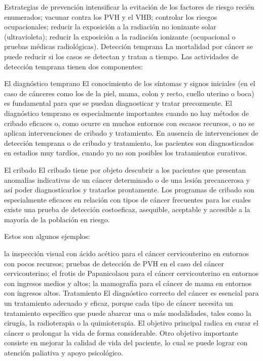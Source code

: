 \documentclass[../pfc.tex]{subfiles}
\begin{document}
Estrategias de prevención
intensificar la evitación de los factores de riesgo recién enumerados;
vacunar contra los PVH y el VHB;
controlar los riesgos ocupacionales;
reducir la exposición a la radiación no ionizante solar (ultravioleta);
reducir la exposición a la radiación ionizante (ocupacional o pruebas médicas radiológicas).
Detección temprana
La mortalidad por cáncer se puede reducir si los casos se detectan y tratan a tiempo. Las actividades de detección temprana tienen dos componentes:

El diagnóstico temprano
El conocimiento de los síntomas y signos iniciales (en el caso de cánceres como los de la piel, mama, colon y recto, cuello uterino o boca) es fundamental para que se puedan diagnosticar y tratar precozmente. El diagnóstico temprano es especialmente importantes cuando no hay métodos de cribado eficaces o, como ocurre en muchos entornos con escasos recursos, o no se aplican intervenciones de cribado y tratamiento. En ausencia de intervenciones de detección temprana o de cribado y tratamiento, los pacientes son diagnosticados en estadios muy tardíos, cuando yo no son posibles los tratamientos curativos.

El cribado
El cribado tiene por objeto descubrir a los pacientes que presentan anomalías indicativas de un cáncer determinado o de una lesión precancerosa y así poder diagnosticarlos y tratarlos prontamente. Los programas de cribado son especialmente eficaces en relación con tipos de cáncer frecuentes para los cuales existe una prueba de detección costoeficaz, asequible, aceptable y accesible a la mayoría de la población en riesgo.

Estos son algunos ejemplos:

la inspección visual con ácido acético para el cáncer cervicouterino en entornos con pocos recursos;
pruebas de detección de PVH en el caso del cáncer cervicouterino;
el frotis de Papanicolaou para el cáncer cervicouterino en entornos con ingresos medios y altos;
la mamografía para el cáncer de mama en entornos con ingresos altos.
Tratamiento
El diagnóstico correcto del cáncer es esencial para un tratamiento adecuado y eficaz, porque cada tipo de cáncer necesita un tratamiento específico que puede abarcar una o más modalidades, tales como la cirugía, la radioterapia o la quimioterapia. El objetivo principal radica en curar el cáncer o prolongar la vida de forma considerable. Otro objetivo importante consiste en mejorar la calidad de vida del paciente, lo cual se puede lograr con atención paliativa y apoyo psicológico.
\end{document}
